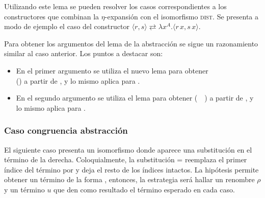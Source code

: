 
Utilizando este lema se pueden resolver los casos correspondientes a los constructores que combinan la $\eta$-expansión con el isomorfismo \textsc{dist}.
Se presenta a modo de ejemplo el caso del constructor  $\langle r,s \rangle \rightleftarrows \lambda x^A. \langle r \, x,s \, x \rangle$.


Para obtener los argumentos del lema de la abstracción se sigue un razonamiento similar al caso anterior.
Los puntos a destacar son:
\begin{itemize}
	\item En el primer argumento se utiliza el nuevo lema  para obtener \\ \snstar() a partir de , y lo mismo aplica para .
	
	
	\item En el segundo argumento se utiliza el lema  para obtener \snstar(~~) a partir de , y lo mismo aplica para .
\end{itemize}

\subsubsection{Caso congruencia abstracción}

El siguiente caso presenta un isomorfismo donde aparece una substitución en el término de la derecha.
Coloquialmente, la substitución
  =
\cons
{\const{[}  \const{]≡} }
{}
reemplaza el primer índice del término por
\const{[}  \const{]≡} 
y deja el resto de los índices intactos.
La hipótesis  permite obtener un término de la forma
\snstar
{}, entonces, la estrategia será hallar un renombre $\rho$ y un término $u$ que den como resultado el término esperado en cada caso.

